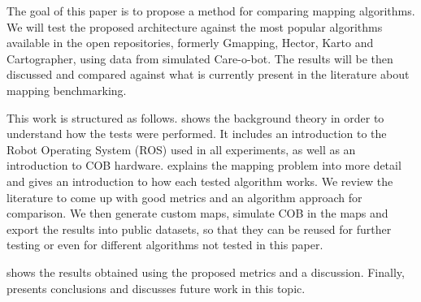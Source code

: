 The goal of this paper is to propose a method for comparing mapping algorithms. We will test the proposed architecture against the most popular algorithms available in the open repositories, formerly Gmapping, Hector, Karto and Cartographer, using data from simulated Care-o-bot. The results will be then discussed and compared against what is currently present in the literature about mapping benchmarking.

This work is structured as follows.  shows the background theory in order to understand how the tests were performed. It includes an introduction to the Robot Operating System (ROS) used in all experiments, as well as an introduction to COB hardware.  explains the mapping problem into more detail and gives an introduction to how each tested algorithm works. We review the literature to come up with good metrics and an algorithm approach for comparison. We then generate custom maps, simulate COB in the maps and export the results into public datasets, so that they can be reused for further testing or even for different algorithms not tested in this paper.

 shows the results obtained using the proposed metrics and a discussion. Finally,  presents conclusions and discusses future work in this topic.











